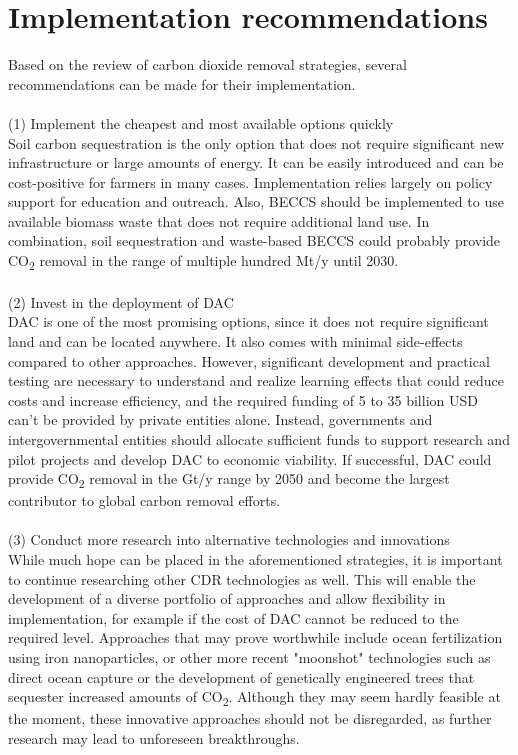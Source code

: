 \newpage
\section{Implementation recommendations}
Based on the review of carbon dioxide removal strategies, several recommendations can be made for their implementation.\\
\\(1) Implement the cheapest and most available options quickly\\
Soil carbon sequestration is the only option that does not require significant new infrastructure or large amounts of energy. It can be easily introduced and can be cost-positive for farmers in many cases. Implementation relies largely on policy support for education and outreach. Also, BECCS should be implemented to use available biomass waste that does not require additional land use. In combination, soil sequestration and waste-based BECCS could probably provide CO\textsubscript{2} removal in the range of multiple hundred Mt/y until 2030.\\
\\(2) Invest in the deployment of DAC\\
DAC is one of the most promising options, since it does not require significant land and can be located anywhere. It also comes with minimal side-effects compared to other approaches. However, significant development and practical testing are necessary to understand and realize learning effects that could reduce costs and increase efficiency, and the required funding of 5 to 35 billion USD can't be provided by private entities alone. Instead, governments and intergovernmental entities should allocate sufficient funds to support research and pilot projects and develop DAC to economic viability. If successful, DAC could provide CO\textsubscript{2} removal in the Gt/y range by 2050 and become the largest contributor to global carbon removal efforts.\\
\\(3) Conduct more research into alternative technologies and innovations\\
While much hope can be placed in the aforementioned strategies, it is important to continue researching other CDR technologies as well. This will enable the development of a diverse portfolio of approaches and allow flexibility in implementation, for example if the cost of DAC cannot be reduced to the required level. Approaches that may prove worthwhile include ocean fertilization using iron nanoparticles, or other more recent "moonshot" technologies such as direct ocean capture or the development of genetically engineered trees that sequester increased amounts of CO\textsubscript{2}. Although they may seem hardly feasible at the moment, these innovative approaches should not be disregarded, as further research may lead to unforeseen breakthroughs.